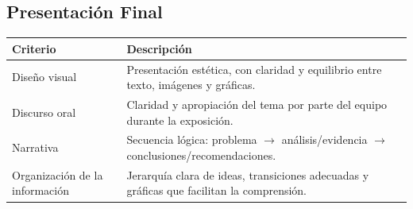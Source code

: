 \documentclass[12pt, spanish]{article}
\begin{document}
\subsection*{Presentación Final}
\begin{table}[h!]
\centering
\begin{tabular}{|p{4cm}|p{10cm}|}
\hline
\textbf{Criterio} & \textbf{Descripción} \\
\hline
Diseño visual & Presentación estética, con claridad y equilibrio entre texto, imágenes y gráficas. \\
\hline
Discurso oral & Claridad y apropiación del tema por parte del equipo durante la exposición. \\
\hline
Narrativa & Secuencia lógica: problema $\rightarrow$ análisis/evidencia $\rightarrow$ conclusiones/recomendaciones. \\
\hline
Organización de la información & Jerarquía clara de ideas, transiciones adecuadas y gráficas que facilitan la comprensión. \\
\hline
\end{tabular}
\end{table}
\end{document}
